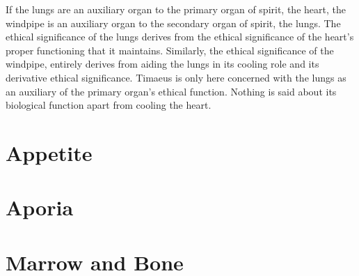 If the lungs are an auxiliary organ to the primary organ of spirit, the heart, the windpipe is an auxiliary organ to the secondary organ of spirit, the lungs. The ethical significance of the lungs derives from the ethical significance of the heart's proper functioning that it maintains. Similarly, the ethical significance of the windpipe, entirely derives from aiding the lungs in its cooling role and its derivative ethical significance. Timaeus is only here concerned with the lungs as an auxiliary of the primary organ's ethical function. Nothing is said about its biological function apart from cooling the heart. 




\section{Appetite} %
\label{sec:appetite}




\section{Aporia} %
\label{sec:aporia}




\section{Marrow and Bone} %
\label{sec:marrow_and_bone}




